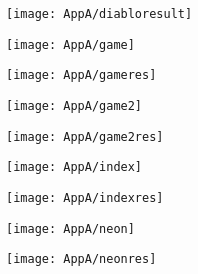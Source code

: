 \documentclass[draft,final]{vutinfth} %
\begin{document}
\begin{appendices}
\begin{figure}[H]
\begin{subfigure}[b]{0.45\columnwidth}
		\end{subfigure}
		\begin{subfigure}[b]{0.45\columnwidth}
			\centering
			\texttt{[image: AppA/diabloresult]}
		\end{subfigure}
		\end{figure} 
			\begin{figure}[H]
			\centering
			\begin{subfigure}[b]{0.45\columnwidth}
				\centering
				\texttt{[image: AppA/game]}
			\end{subfigure}
			\begin{subfigure}[b]{0.45\columnwidth}
				\centering
				\texttt{[image: AppA/gameres]}
			\end{subfigure}
		\end{figure}    
		\begin{figure}[H]
		\centering
		\begin{subfigure}[b]{0.45\columnwidth}
			\centering
			\texttt{[image: AppA/game2]}
		\end{subfigure}
		\begin{subfigure}[b]{0.45\columnwidth}
			\centering
			\texttt{[image: AppA/game2res]}
		\end{subfigure}
		\end{figure}
			\begin{figure}[H]
			\centering
			\begin{subfigure}[b]{0.45\columnwidth}
				\centering
				\texttt{[image: AppA/index]}
			\end{subfigure}
			\begin{subfigure}[b]{0.45\columnwidth}
				\centering
				\texttt{[image: AppA/indexres]}
			\end{subfigure}
		\end{figure}    
		\begin{figure}[H]
		\centering
		\begin{subfigure}[b]{0.45\columnwidth}
			\centering
			\texttt{[image: AppA/neon]}
		\end{subfigure}
		\begin{subfigure}[b]{0.45\columnwidth}
			\centering
			\texttt{[image: AppA/neonres]}
		\end{subfigure}
		\end{figure} 
			\begin{figure}[H]
			\centering
			\begin{subfigure}[b]{0.45\columnwidth}

\end{subfigure}
\end{figure}
\end{appendices}
\end{document}
